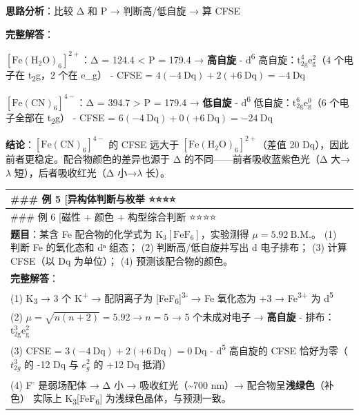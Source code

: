 \documentclass[a4paper,11pt]{ctexart}
\newcounter{none}
\begin{document}
\textbf{思路分析}：比较 Δ 和 P → 判断高/低自旋 → 算 CFSE

\textbf{完整解答}：

\textbf{\([\mathrm{Fe(H_2O)_6}]^{2+}\)}：Δ = 124.4 \textless{} P = 179.4 → \textbf{高自旋}
- d\textsuperscript{6} 高自旋：\(\mathrm{t_{2g}^4 e_g^2}\)（4 个电子在 t\textsubscript{2}g，2 个在 e\_g）
- CFSE = \(4(-4\ \mathrm{Dq}) + 2(+6\ \mathrm{Dq}) = -4\ \mathrm{Dq}\)

\textbf{\([\mathrm{Fe(CN)_6}]^{4-}\)}：Δ = 394.7 \textgreater{} P = 179.4 → \textbf{低自旋}
- d\textsuperscript{6} 低自旋：\(\mathrm{t_{2g}^6 e_g^0}\)（6 个电子全部在 t\textsubscript{2}g）
- CFSE = \(6(-4\ \mathrm{Dq}) + 0(+6\ \mathrm{Dq}) = -24\ \mathrm{Dq}\)

\textbf{结论}：\([\mathrm{Fe(CN)_6}]^{4-}\) 的 CFSE 远大于 \([\mathrm{Fe(H_2O)_6}]^{2+}\)（差值 20 Dq），因此前者更稳定。配合物颜色的差异也源于 Δ 的不同------前者吸收蓝紫色光（Δ 大→\(\lambda\) 短），后者吸收红光（Δ 小→\(\lambda\) 长）。

{\def\LTcaptype{none} %
\begin{longtable}[]{@{}
  >{\raggedright\arraybackslash}p{}@{}}
\toprule\noalign{}
\begin{minipage}[b]{\linewidth}\raggedright
\#\#\# 例 5 {[}异构体判断与枚举 ⭐⭐⭐⭐
\end{minipage} \\
\midrule\noalign{}
\endhead
\bottomrule\noalign{}
\endlastfoot
\#\#\# 例 6 {[}磁性 + 颜色 + 构型综合判断 ⭐⭐⭐⭐ \\
\textbf{题目}：某含 Fe 配合物的化学式为 \(\mathrm{K_3[FeF_6]}\)，实验测得 \(\mu = 5.92\ \mathrm{B.M.}\)。
(1) 判断 Fe 的氧化态和 dⁿ 组态；
(2) 判断高/低自旋并写出 d 电子排布；
(3) 计算 CFSE（以 Dq 为单位）；
(4) 预测该配合物的颜色。 \\
\textbf{完整解答}： \\
(1) K\textsubscript{3} → 3 个 K\textsuperscript{+} → 配阴离子为 {[}FeF\textsubscript{6}{]}\textsuperscript{3-} → Fe 氧化态为 +3 → Fe\textsuperscript{3+} 为 d\textsuperscript{5} \\
(2) \(\mu = \sqrt{n(n+2)} = 5.92 \rightarrow n = 5\) → 5 个未成对电子 → \textbf{高自旋}
- 排布：\(\mathrm{t_{2g}^3 e_g^2}\) \\
(3) CFSE = \(3(-4\ \mathrm{Dq}) + 2(+6\ \mathrm{Dq}) = 0\ \mathrm{Dq}\)
- d\textsuperscript{5} 高自旋的 CFSE 恰好为零（\(t_{2g}^3\) 的 -12 Dq 与 \(e_g^2\) 的 +12 Dq 抵消） \\
(4) F\textsuperscript{-} 是弱场配体 → Δ 小 → 吸收红光（\textasciitilde700 nm）→ 配合物呈\textbf{浅绿色}（补色）
实际上 K\textsubscript{3}{[}FeF\textsubscript{6}{]} 为浅绿色晶体，与预测一致。 \\
\end{longtable}
}
\end{document}
